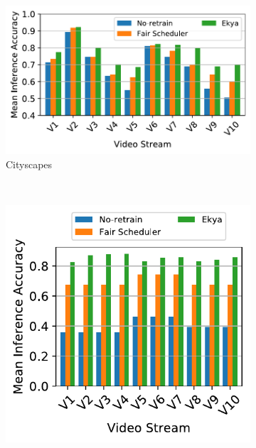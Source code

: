 

\begin{figure}
  \centering
  \begin{subfigure}[t]{0.5\linewidth}
    \centering
    \includegraphics[width=\linewidth]{results/multicam/multicam_individual_stream_acc_cityscapes.pdf} 
    \caption{\small Cityscapes}
    \label{fig:multicam-cities-cityscapes}
  \end{subfigure}
  ~~~
  \begin{subfigure}[t]{0.5\linewidth}
    \centering
    \includegraphics[width=\linewidth]{results/multicam/multicam_individual_stream_acc_waymo.pdf}

\end{subfigure}
\end{figure}
